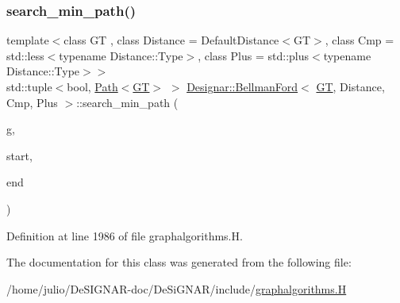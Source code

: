 \subsubsection{\texorpdfstring{search\+\_\+min\+\_\+path()}{search\_min\_path()}}
{\footnotesize\ttfamily template$<$class GT , class Distance  = Default\+Distance$<$\+G\+T$>$, class Cmp  = std\+::less$<$typename Distance\+::\+Type$>$, class Plus  = std\+::plus$<$typename Distance\+::\+Type$>$$>$ \\
std\+::tuple$<$bool, \hyperlink{class_designar_1_1_path}{Path}$<$\hyperlink{demo-buildgraph_8_c_a3001c40d2c31ca87ed96cd7d1334a55e}{GT}$>$ $>$ \hyperlink{class_designar_1_1_bellman_ford}{Designar\+::\+Bellman\+Ford}$<$ \hyperlink{demo-buildgraph_8_c_a3001c40d2c31ca87ed96cd7d1334a55e}{GT}, Distance, Cmp, Plus $>$\+::search\+\_\+min\+\_\+path (\begin{DoxyParamCaption}\item[{\hyperlink{demo-buildgraph_8_c_a3001c40d2c31ca87ed96cd7d1334a55e}{GT} \&}]{g,  }\item[{Node \&}]{start,  }\item[{Node \&}]{end }\end{DoxyParamCaption})\hspace{0.3cm}{\ttfamily [inline]}}



Definition at line 1986 of file graphalgorithms.\+H.



The documentation for this class was generated from the following file\+:\begin{DoxyCompactItemize}
\item 
/home/julio/\+De\+S\+I\+G\+N\+A\+R-\/doc/\+De\+Si\+G\+N\+A\+R/include/\hyperlink{graphalgorithms_8_h}{graphalgorithms.\+H}\end{DoxyCompactItemize}
